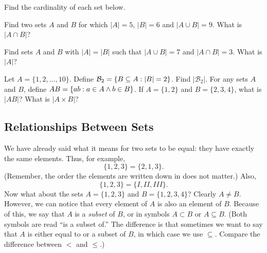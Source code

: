 \documentclass[12pt]{article}
\begin{document}
\begin{activity}
\begin{questions}
\question Find the cardinality of each set below.

\question Find two sets $A$ and $B$ for which $|A| = 5$, $|B| = 6$ and $|A\cup B| = 9$.  What is $|A \cap B|$?

\question Find sets $A$ and $B$ with $|A| = |B|$ such that $|A\cup B| = 7$ and $|A \cap B| = 3$.  What is $|A|$?

\question Let $A = \{1,2,\ldots, 10\}$.  Define $\mathcal{B}_2 = \{B \subseteq A : |B| = 2\}$.  Find $|\mathcal{B}_2|$.
\question For any sets $A$ and $B$, define $AB = \{ab : a\in A \wedge b \in B\}$.  If $A = \{1,2\}$ and $B = \{2,3,4\}$, what is $|AB|$?  What is $|A \times B|$?
\end{questions}
\end{activity}



\subsection{Relationships Between Sets}

We have already said what it means for two sets to be equal: they have exactly the same elements.  Thus, for example,
\[ \{1, 2, 3\} = \{2, 1, 3\}.\]
(Remember, the order the elements are written down in does not matter.)  Also,
\[ \{1, 2, 3\} = \{I, II, III\}.\]
Now what about the sets $A = \{1, 2, 3\}$ and $B = \{1, 2, 3, 4\}$?  Clearly $A \ne B$.  However, we can notice that every element of $A$ is also an element of $B$.  Because of this, we say that $A$ is a \emph{subset} of $B$, or in symbols $A \subset B$ or $A \subseteq B$.  (Both symbols are read ``is a subset of.'' The difference is that sometimes we want to say that $A$ is either equal to or a subset of $B$, in which case we use $\subseteq$.  Compare the difference between $<$ and $\le$.)
\end{document}
